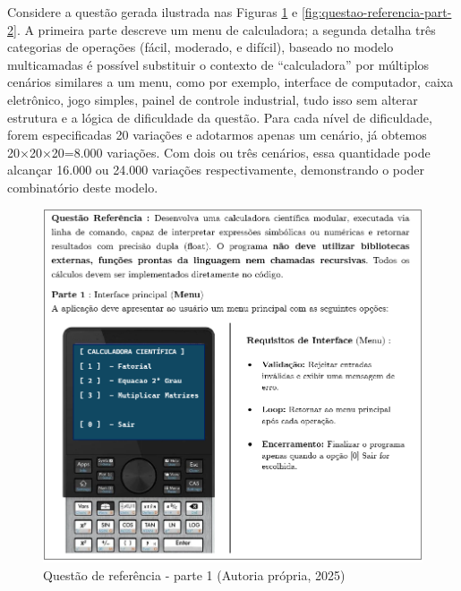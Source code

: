 Considere a questão gerada ilustrada nas Figuras \ref{fig:questao-referencia-part-1} e \ref{fig:questao-referencia-part-2}. A primeira parte descreve um menu de calculadora; a segunda detalha três categorias de operações (fácil, moderado, e difícil), baseado no modelo multicamadas é possível substituir o contexto de “calculadora” por múltiplos cenários similares a um menu, como por exemplo, interface de computador, caixa eletrônico, jogo simples, painel de controle industrial, tudo isso sem alterar estrutura e a lógica de dificuldade da questão. Para cada nível de dificuldade, forem especificadas 20 variações e adotarmos apenas um cenário, já obtemos 20×20×20=8.000 variações. Com dois ou três cenários, essa quantidade pode alcançar 16.000 ou 24.000 variações respectivamente, demonstrando o poder combinatório deste modelo.


\begin{figure}[ht]
	\centering
	\includegraphics[width=12cm]{./imagens/capitulo4/questao-referencia-1.png}
	\caption{Questão de referência - parte 1 (Autoria própria, 2025)}
	\label{fig:questao-referencia-part-1}
\end{figure}


